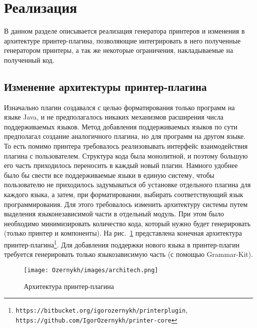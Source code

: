 \section{Реализация}
\label{sec:impl}
\lstset{basicstyle=\normalsize\ttfamily, columns=fullflexible}
В данном разделе описывается реализация генератора принтеров и изменения в архитектуре принтер-плагина, позволяющие интегрировать в него полученные генератором принтеры, а так же некоторые ограничения, накладываемые на полученный код.

\subsection{Изменение архитектуры принтер-плагина}
Изначально плагин создавался с целью форматирования только программ на языке Java, и не предполагалось никаких механизмов расширения числа поддерживаемых языков.
Метод добавления поддерживаемых языков \cite{paper:while} по сути предполагал создание аналогичного плагина, но для программ на другом языке.
То есть помимо принтера требовалось реализовывать интерфейс взаимодействия плагина с пользователем.
Структура кода была монолитной, и поэтому большую его часть приходилось переносить в каждый новый плагин.
Намного удобнее было бы свести все поддерживаемые языки в единую систему, чтобы пользователю не приходилось задумываться об установке отдельного плагина для каждого языка, а затем, при форматировании, выбирать соответствующий язык программирования.
Для этого требовалось изменить архитектуру системы путем выделения языконезависимой части в отдельный модуль.
При этом было необходимо минимизировать количество кода, который нужно будет генерировать (только принтер и компоненты).
На рис.~\ref{impl:architechture} представлена конечная архитектура принтер-плагина\footnote{\texttt{https://bitbucket.org/igorozernykh/printerplugin}, \texttt{https://github.com/IgorOzernykh/printer-core}}.
Для добавления поддержки нового языка в принтер-плагин требуется генерировать только языкозависимую часть (с помощью Grammar-Kit).
\begin{figure}[h]
    \centering
    \texttt{[image: Ozernykh/images/architech.png]}
    \caption{Архитектура принтер-плагина}
    \label{impl:architechture}
\end{figure}

